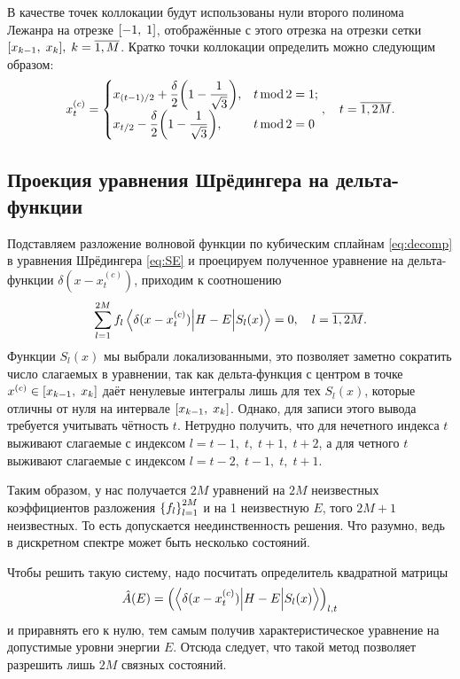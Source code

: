 \documentclass[10pt]{article}
\begin{document}
В качестве точек коллокации будут использованы нули второго полинома Лежанра на отрезке $\qty[-1,\;1]$, отображённые с этого отрезка на отрезки сетки $\qty[x_{k-1},\;x_{k}],\; k=\overline{1,M}$. Кратко точки коллокации определить можно следующим образом:
\begin{equation}
    x^{(c)}_t =
    \begin{cases}
        x_{(t-1)/2} + \dfrac{\delta}{2} \qty(1 - \dfrac{1}{\sqrt{3}}), &{t\,\textrm{mod}\,2 = 1};\\
        x_{t/2} - \dfrac{\delta}{2} \qty(1 - \dfrac{1}{\sqrt{3}}), &{t\,\textrm{mod}\,2 = 0}
    \end{cases}
    ,\quad t = \overline{1, 2M}.
\end{equation}

\subsection{Проекция уравнения Шрёдингера на дельта-функции}

Подставляем разложение волновой функции по кубическим сплайнам \eqref{eq:decomp} в уравнения Шрёдингера \eqref{eq:SE} и проецируем полученное уравнение на дельта-функции $\delta(x-x^{(c)}_t)$, приходим к соотношению
\begin{equation}
    \sum\limits_{l=1}^{2M} f_{l}
    \mel**{\delta(x-x^{(c)}_t)}{H-E}{S_{l}(x)}=0,\quad l=\overline{1,2M}.
\end{equation}
Функции $S_l(x)$ мы выбрали локализованными, это позволяет заметно сократить число слагаемых в уравнении, так как дельта-функция с центром в точке $x^{(c)}\in\qty[x_{k-1},\;x_{k}]$ даёт ненулевые интегралы лишь для тех $S_l(x)$, которые отличны от нуля на интервале $\qty[x_{k-1},\;x_{k}]$. Однако, для записи этого вывода требуется учитывать чётность $t$. Нетрудно получить, что для нечетного индекса $t$ выживают слагаемые с индексом $l=t-1,\;t,\;t+1,\;t+2$, а для четного $t$ выживают слагаемые с индексом $l=t-2,\;t-1,\;t,\;t+1$.

Таким образом, у нас получается $2M$ уравнений на $2M$ неизвестных коэффициентов разложения $\qty{f_l}_{l=1}^{2M}$ и на 1 неизвестную $E$, того $2M+1$ неизвестных. То есть допускается неединственность решения. Что разумно, ведь в дискретном спектре может быть несколько состояний.

Чтобы решить такую систему, надо посчитать определитель квадратной матрицы
\begin{equation}
    \hat A(E) = \qty(\mel**{\delta(x-x^{(c)}_t)}{H-E}{S_{l}(x)})_{l,t}
\end{equation}
и приравнять его к нулю, тем самым получив характеристическое уравнение на допустимые уровни энергии $E$. Отсюда следует, что такой метод позволяет разрешить лишь $2M$ связных состояний.
\end{document}
